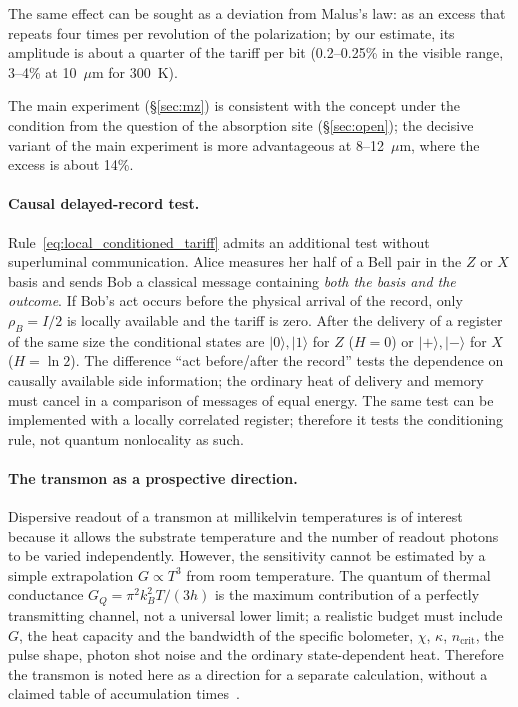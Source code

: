 \documentclass[11pt,a4paper]{article}
\newcommand{\Sref}[1]{\hyperref[#1]{\S\ref{#1}}}
\begin{document}
The same effect can be sought as a deviation from Malus's law: as an excess that repeats four times per revolution of the polarization; by our estimate, its amplitude is about a quarter of the tariff per bit (0.2--0.25\% in the visible range, 3--4\% at 10~$\mu$m for 300~K).

The main experiment (\Sref{sec:mz}) is consistent with the concept under the condition from the question of the absorption site (\Sref{sec:open}); the decisive variant of the main experiment is more advantageous at 8--12~$\mu$m, where the excess is about 14\%.

\paragraph{Causal delayed-record test.}
Rule~\eqref{eq:local_conditioned_tariff} admits an additional test without superluminal communication. Alice measures her half of a Bell pair in the $Z$ or $X$ basis and sends Bob a classical message containing \emph{both the basis and the outcome}. If Bob's act occurs before the physical arrival of the record, only $\rho_B=I/2$ is locally available and the tariff is zero. After the delivery of a register of the same size the conditional states are $|0\rangle,|1\rangle$ for $Z$ ($H=0$) or $|+\rangle,|-\rangle$ for $X$ ($H=\ln2$). The difference ``act before/after the record'' tests the dependence on causally available side information; the ordinary heat of delivery and memory must cancel in a comparison of messages of equal energy. The same test can be implemented with a locally correlated register; therefore it tests the conditioning rule, not quantum nonlocality as such.

\paragraph{The transmon as a prospective direction.}
Dispersive readout of a transmon at millikelvin temperatures is of interest because it allows the substrate temperature and the number of readout photons to be varied independently. However, the sensitivity cannot be estimated by a simple extrapolation $G\propto T^3$ from room temperature. The quantum of thermal conductance $G_Q=\pi^2k_B^2T/(3h)$ is the maximum contribution of a perfectly transmitting channel, not a universal lower limit; a realistic budget must include $G$, the heat capacity and the bandwidth of the specific bolometer, $\chi$, $\kappa$, $n_{\mathrm{crit}}$, the pulse shape, photon shot noise and the ordinary state-dependent heat. Therefore the transmon is noted here as a direction for a separate calculation, without a claimed table of accumulation times~\cite{schwab2000,gambetta2006}.
\end{document}
